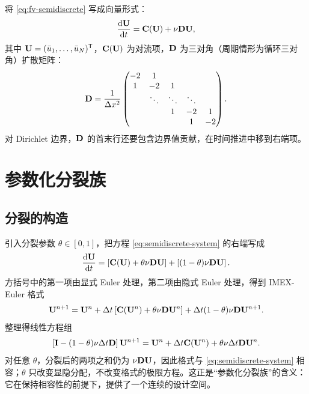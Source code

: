 将 \eqref{eq:fv-semidiscrete} 写成向量形式：
\begin{equation}
  \frac{\mathrm{d}{\mathbf{U}}}{\mathrm{d} t}={\mathbf{C}}({\mathbf{U}})+\nu{\mathbf{D}}{\mathbf{U}},
  \label{eq:semidiscrete-system}
\end{equation}
其中 ${\mathbf{U}}=(\bar u_1,\dots,\bar u_N)^{\mathsf T}$，${\mathbf{C}}({\mathbf{U}})$ 为对流项，${\mathbf{D}}$ 为三对角（周期情形为循环三对角）扩散矩阵：
\begin{equation}
  {\mathbf{D}}=\frac{1}{\Delta x^2}
  \begin{pmatrix}
    -2 & 1 & & & \\
    1 & -2 & 1 & & \\
      & \ddots & \ddots & \ddots & \\
      & & 1 & -2 & 1\\
      & & & 1 & -2
  \end{pmatrix}.
  \label{eq:laplacian-matrix}
\end{equation}
对 Dirichlet 边界，${\mathbf{D}}$ 的首末行还要包含边界值贡献，在时间推进中移到右端项。

\section{参数化分裂族}
\label{sec:theta-family}

\subsection{分裂的构造}

引入分裂参数 $\theta\in[0,1]$，把方程 \eqref{eq:semidiscrete-system} 的右端写成
\begin{equation}
  \frac{\mathrm{d}{\mathbf{U}}}{\mathrm{d} t}
  =\left[{\mathbf{C}}({\mathbf{U}})+\theta\nu{\mathbf{D}}{\mathbf{U}}\right]
  +\left[(1-\theta)\nu{\mathbf{D}}{\mathbf{U}}\right].
  \label{eq:theta-split}
\end{equation}
方括号中的第一项由显式 Euler 处理，第二项由隐式 Euler 处理，得到 IMEX-Euler 格式
\begin{equation}
  {\mathbf{U}}^{n+1}={\mathbf{U}}^n+\Delta t\left[{\mathbf{C}}({\mathbf{U}}^n)+\theta\nu{\mathbf{D}}{\mathbf{U}}^n\right]
  +\Delta t(1-\theta)\nu{\mathbf{D}}{\mathbf{U}}^{n+1}.
  \label{eq:theta-imex}
\end{equation}
整理得线性方程组
\begin{equation}
  \left[{\mathbf{I}}-(1-\theta)\nu\Delta t{\mathbf{D}}\right]{\mathbf{U}}^{n+1}
  ={\mathbf{U}}^n+\Delta t{\mathbf{C}}({\mathbf{U}}^n)+\theta\nu\Delta t{\mathbf{D}}{\mathbf{U}}^n.
  \label{eq:theta-linear-system}
\end{equation}
对任意 $\theta$，分裂后的两项之和仍为 $\nu{\mathbf{D}}{\mathbf{U}}$，因此格式与 \eqref{eq:semidiscrete-system} 相容；$\theta$ 只改变显隐分配，不改变格式的极限方程。这正是“参数化分裂族”的含义：它在保持相容性的前提下，提供了一个连续的设计空间。

